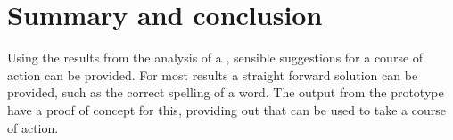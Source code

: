 \section{Summary and conclusion}

Using the results from the analysis of a , sensible
suggestions for a course of action can be provided.  For most results
a straight forward solution can be provided, such as the correct
spelling of a word.  The output from the prototype {\orangutan} have a
proof of concept for this, providing out that can be used to take a
course of action.

